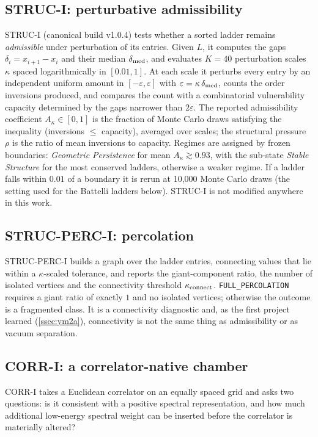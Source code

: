 \documentclass[11pt,a4paper]{article}
\theoremstyle{definition}
\theoremstyle{remark}
\begin{document}
\subsection{STRUC-I: perturbative admissibility}\label{ssec:struci}
STRUC-I (canonical build v1.0.4) tests whether a sorted ladder remains \emph{admissible} under perturbation of its entries. Given $L$, it computes the gaps $\delta_i=x_{i+1}-x_i$ and their median $\delta_{\rm med}$, and evaluates $K=40$ perturbation scales $\kappa$ spaced logarithmically in $[0.01,1]$. At each scale it perturbs every entry by an independent uniform amount in $[-\varepsilon,\varepsilon]$ with $\varepsilon=\kappa\,\delta_{\rm med}$, counts the order inversions produced, and compares the count with a combinatorial vulnerability capacity determined by the gaps narrower than $2\varepsilon$. The reported admissibility coefficient $A_\kappa\in[0,1]$ is the fraction of Monte Carlo draws satisfying the inequality (inversions $\le$ capacity), averaged over scales; the structural pressure $\rho$ is the ratio of mean inversions to capacity. Regimes are assigned by frozen boundaries: \emph{Geometric Persistence} for mean $A_\kappa\gtrsim0.93$, with the sub-state \emph{Stable Structure} for the most conserved ladders, otherwise a weaker regime. If a ladder falls within $0.01$ of a boundary it is rerun at 10{,}000 Monte Carlo draws (the setting used for the Battelli ladders below). STRUC-I is not modified anywhere in this work.

\subsection{STRUC-PERC-I: percolation}\label{ssec:strucperc}
STRUC-PERC-I builds a graph over the ladder entries, connecting values that lie within a $\kappa$-scaled tolerance, and reports the giant-component ratio, the number of isolated vertices and the connectivity threshold $\kappa_{\rm connect}$. \texttt{FULL\_PERCOLATION} requires a giant ratio of exactly $1$ and no isolated vertices; otherwise the outcome is a fragmented class. It is a connectivity diagnostic and, as the first project learned (\cref{ssec:ym2a}), connectivity is not the same thing as admissibility or as vacuum separation.

\subsection{CORR-I: a correlator-native chamber}\label{ssec:corri}
CORR-I takes a Euclidean correlator on an equally spaced grid and asks two questions: is it consistent with a positive spectral representation, and how much additional low-energy spectral weight can be inserted before the correlator is materially altered?
\end{document}
